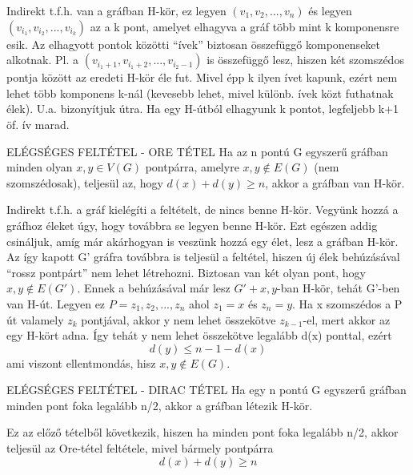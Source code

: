 \begin{bizonyitas}{}
Indirekt t.f.h. van a gráfban H-kör, ez legyen $(v_1, v_2,..., v_n)$ és legyen $(v_{i_1}, v_{i_2},...,v_{i_k})$ az a k pont, amelyet elhagyva a gráf több mint k komponensre esik. Az elhagyott pontok közötti ``ívek'' biztosan összefüggő komponenseket alkotnak. Pl. a $(v_{i_{1}+1}, v_{i_{1}+2},..., v_{i_{2}-1})$ is összefüggő lesz, hiszen két szomszédos pontja között az eredeti H-kör éle fut. Mivel épp k ilyen ívet kapunk, ezért nem lehet több komponens k-nál (kevesebb lehet, mivel különb. ívek közt futhatnak élek). U.a. bizonyítjuk útra. Ha egy H-útból elhagyunk k pontot, legfeljebb k+1 öf. ív marad.
\end{bizonyitas}

\begin{tetel}{ELÉGSÉGES FELTÉTEL - ORE TÉTEL}
Ha az n pontú G egyszerű gráfban minden olyan $x,y\in V(G)$ pontpárra, amelyre ${x,y}\not\in E(G)$ (nem szomszédosak), teljesül az, hogy $d(x) + d(y) \geq n$, akkor a gráfban van H-kör.
\end{tetel}

\begin{bizonyitas}{}
Indirekt t.f.h. a gráf kielégíti a feltételt, de nincs benne H-kör. Vegyünk hozzá a gráfhoz éleket úgy, hogy továbbra se legyen benne H-kör. Ezt egészen addig csináljuk, amíg már akárhogyan is veszünk hozzá egy élet, lesz a gráfban H-kör. Az így kapott G' gráfra továbbra is teljesül a feltétel, hiszen új élek behúzásával ``rossz pontpárt'' nem lehet létrehozni. Biztosan van két olyan pont, hogy ${x,y} \not \in E(G')$. Ennek a behúzásával már lesz $G' + {x,y}$-ban H-kör, tehát G'-ben van H-út. Legyen ez $P = {z_1, z_2,...,z_n}$ ahol $z_1 = x$ és $z_n = y$.
Ha x szomszédos a P út valamely $z_k$ pontjával, akkor y nem lehet összekötve $z_{k-1}$-el, mert akkor az egy H-kört adna. Így tehát y nem lehet összekötve legalább d(x) ponttal, ezért
$$d(y) \leq n - 1 - d(x)$$
ami viszont ellentmondás, hisz ${x,y} \not\in E(G)$.
\end{bizonyitas}

\begin{tetel}{ELÉGSÉGES FELTÉTEL - DIRAC TÉTEL}
Ha egy n pontú G egyszerű gráfban minden pont foka legalább n/2, akkor a gráfban létezik H-kör.
\end{tetel}

\begin{bizonyitas}{}
Ez az előző tételből következik, hiszen ha minden pont foka legalább n/2, akkor teljesül az Ore-tétel feltétele, mivel bármely pontpárra $$d(x) + d(y) \geq n$$
\end{bizonyitas}
